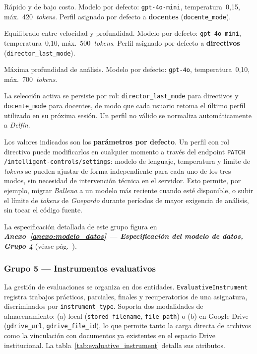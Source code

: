 \begin{description}[noitemsep, leftmargin=1.4cm, labelwidth=1.2cm]
  \item[\textit{Guepardo}] R\'{a}pido y de bajo costo.
    Modelo por defecto: \texttt{gpt-4o-mini}, temperatura~0{,}15,
    m\'{a}x.\ 420~\textit{tokens}.
    Perfil asignado por defecto a \textbf{docentes}
    (\texttt{docente\_mode}).
  \item[\textit{Delf\'{i}n}] Equilibrado entre velocidad y profundidad.
    Modelo por defecto: \texttt{gpt-4o-mini}, temperatura~0{,}10,
    m\'{a}x.\ 500~\textit{tokens}.
    Perfil asignado por defecto a \textbf{directivos}
    (\texttt{director\_last\_mode}).
  \item[\textit{Ballena}] M\'{a}xima profundidad de an\'{a}lisis.
    Modelo por defecto: \texttt{gpt-4o}, temperatura~0{,}10,
    m\'{a}x.\ 700~\textit{tokens}.
    
\end{description}

\noindent La selecci\'{o}n activa se persiste por rol:
\texttt{director\_last\_mode} para directivos y
\texttt{docente\_mode} para docentes, de modo que cada usuario retoma
el \'{u}ltimo perfil utilizado en su pr\'{o}xima sesi\'{o}n.
Un perfil no v\'{a}lido se normaliza autom\'{a}ticamente a
\textit{Delf\'{i}n}.

Los valores indicados son los \textbf{par\'{a}metros por defecto}.
Un perfil con rol directivo puede modificarlos en cualquier momento a
trav\'{e}s del endpoint \texttt{PATCH /intelligent-controls/settings}:
modelo de lenguaje, temperatura y l\'{i}mite de \textit{tokens} se
pueden ajustar de forma independiente para cada uno de los tres modos,
sin necesidad de intervenci\'{o}n técnica en el servidor.
Esto permite, por ejemplo, migrar \textit{Ballena} a un modelo más
reciente cuando est\'{e} disponible, o subir el l\'{i}mite de
\textit{tokens} de \textit{Guepardo} durante períodos de mayor
exigencia de an\'{a}lisis, sin tocar el c\'{o}digo fuente.

La especificación detallada de este grupo figura en \textbf{\textit{Anexo~\ref{anexo:modelo_datos} — Especificación del modelo de datos, Grupo 4}} (véase pág.~\pageref{anexo:grupo4_modelo_datos}).

\subsubsection*{Grupo 5 — Instrumentos evaluativos}

La gestión de evaluaciones se organiza en dos entidades. \texttt{EvaluativeInstrument}
registra trabajos prácticos, parciales, finales y recuperatorios de una
asignatura, discriminados por \texttt{instrument\_type}. Soporta dos modalidades
de almacenamiento: (a) local (\texttt{stored\_filename}, \texttt{file\_path})
o (b) en Google Drive (\texttt{gdrive\_url}, \texttt{gdrive\_file\_id}), lo que
permite tanto la carga directa de archivos como la vinculación con documentos
ya existentes en el espacio Drive institucional. La tabla~\ref{tab:evaluative_instrument}
detalla sus atributos.

